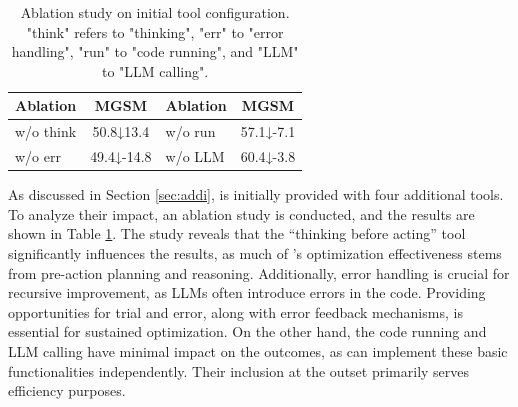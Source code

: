 \begin{table}[ht]
    \centering
    \small
    \begin{tabular}{lc|lc}
        \toprule
        Ablation & MGSM & Ablation & MGSM \\ 
        \midrule
        w/o think & 50.8\scriptsize{↓13.4} & w/o run & 57.1\scriptsize{↓-7.1} \\ 
        w/o err & 49.4\scriptsize{↓-14.8} & w/o LLM & 60.4\scriptsize{↓-3.8} \\ 
        \bottomrule
    \end{tabular}
    \caption{Ablation study on initial tool configuration. "think" refers to "thinking", "err" to "error handling", "run" to "code running", and "LLM" to "LLM calling".}
    \label{tab:ab_tool}
    \vspace{-0.2cm}
\end{table}

As discussed in Section \ref{sec:addi}, \framework is initially provided with four additional tools.
To analyze their impact, an ablation study is conducted, and the results are shown in Table \ref{tab:ab_tool}. The study reveals that the “thinking before acting” tool significantly influences the results, as much of \framework{}’s optimization effectiveness stems from pre-action planning and reasoning. Additionally, error handling is crucial for recursive improvement, as LLMs often introduce errors in the code. 
Providing opportunities for trial and error, along with error feedback mechanisms, is essential for sustained optimization.
On the other hand, the code running and LLM calling have minimal impact on the outcomes, as \framework can implement these basic functionalities independently. Their inclusion at the outset primarily serves efficiency purposes.





